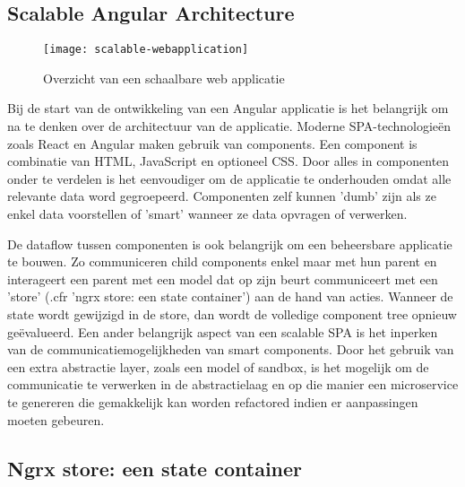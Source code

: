 \subsection{Scalable Angular Architecture}
\begin{figure}[h]
\caption{Overzicht van een schaalbare web applicatie}
\centering
\texttt{[image: scalable-webapplication]}
\end{figure}
Bij de start van de ontwikkeling van een Angular applicatie is het belangrijk om na te denken over de architectuur \autocite{minko-gechev-scalable} van de applicatie. Moderne SPA-technologie\"en zoals React en Angular maken gebruik van components. Een component is combinatie van HTML, JavaScript en optioneel CSS. Door alles in componenten onder te verdelen is het eenvoudiger om de applicatie te onderhouden omdat alle relevante data word gegroepeerd. Componenten zelf kunnen 'dumb' zijn als ze enkel data voorstellen of 'smart' wanneer ze data opvragen of verwerken.

De dataflow tussen componenten is ook belangrijk om een beheersbare \autocite{brechtbilliet-scalable} applicatie te bouwen. Zo communiceren child components enkel maar met hun parent en interageert een parent met een model dat op zijn beurt communiceert met een 'store' (.cfr 'ngrx store: een state container') aan de hand van acties. Wanneer de state wordt gewijzigd in de store, dan wordt de volledige component tree opnieuw ge\"evalueerd. Een ander belangrijk aspect van een scalable SPA is het inperken van de communicatiemogelijkheden van smart components. Door het gebruik van een extra abstractie layer, zoals een model of sandbox, is het mogelijk om de communicatie te verwerken in de abstractielaag en op die manier een microservice te genereren die gemakkelijk kan worden refactored indien er aanpassingen moeten gebeuren.
\clearpage
\subsection{Ngrx store: een state container}

